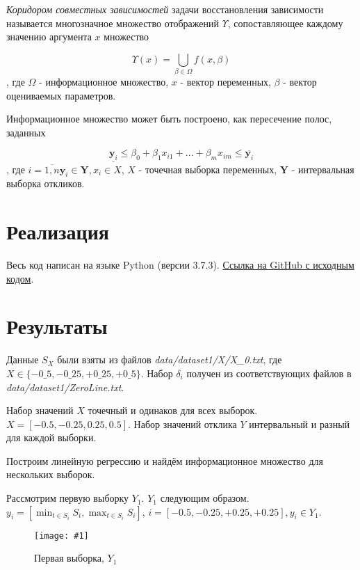 \documentclass[a4paper,12pt]{article}
\newcommand{\plot}[3]{
    \begin{figure}[H]
        \begin{center}
            \texttt{[image: \#1]}
            \caption{#2}
            \label{#3}
        \end{center}
    \end{figure}
}
\begin{document}
    \textsl{Коридором совместных зависимостей} задачи восстановления зависимости
    называется многозначное множество отображений $ \Upsilon $, сопоставляющее
    каждому значению аргумента $ x $ множество
    
    \begin{equation}
        \Upsilon(x) = \bigcup_{\beta \in \Omega} f(x, \beta)
    \end{equation}
    , где $ \Omega $ - информационное множество, $ x $ - вектор переменных, $ \beta $ - вектор оцениваемых параметров. 

    Информационное множество может быть построено, как пересечение полос, заданных
    
    \begin{equation}
        \underline{\textbf{y}_i} \leq \beta_0 + \beta_1 x_{i1} + ... + \beta_m x_{im} \leq \overline{\textbf{y}_i}
    \end{equation}
    , где $ i = \overline{1, n} \textbf{y}_i \in \textbf{Y}, x_i \in X $, $ X $ - точечная выборка переменных,
    $ \textbf{Y} $ - интервальная выборка откликов.

    \section{Реализация}
    \quad Весь код написан на языке Python (версии 3.7.3).
    \href{https://github.com/kirillkuks/Intervals/tree/master/lab2}{Ссылка на GitHub с исходным кодом}.

    \section{Результаты}
    \quad Данные $ S_X $ были взяты из файлов \textsl{data/dataset1/X/X\_0.txt}, \newline
    где $ X \in \{-0\_5, -0\_25, +0\_25, +0\_5 \} $.
    Набор $ \delta_i $ получен из соответствующих файлов в \textsl{data/dataset1/ZeroLine.txt}.

    Набор значений $ X $ точечный и одинаков для всех выборок. \newline
    $ X = [-0.5, -0.25, 0.25, 0.5]  $.
    Набор значений отклика $ Y $ интервальный и разный для каждой выборки.
    
    Построим линейную регрессию и найдём информационное множество для нескольких выборок.

    Рассмотрим первую выборку $ Y_1 $.
    $ Y_1 $ следующим образом. $ y_i = [\min_{t \in S_i}{S_i}, \max_{t \in S_i}{S_i}]$,
    $ i = [-0.5, -0.25, +0.25, +0.25], y_i \in Y_1 $.
    \plot{Y1}{Первая выборка, $ Y_1 $}{p:sampleY1}
\end{document}

